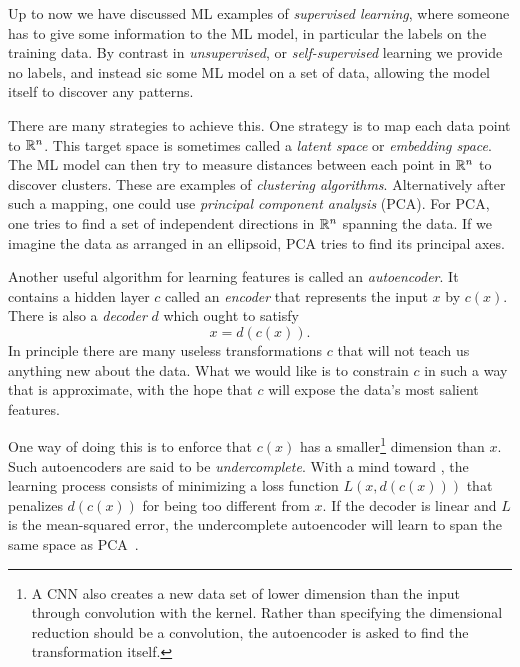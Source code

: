 Up to now we have discussed ML examples of 
{\it supervised learning},
where someone has to give some information to the ML model, in particular the
labels on the training data. By contrast in {\it unsupervised}, 
or {\it self-supervised} learning we provide no
labels, and instead sic some
ML model on a set of data, allowing the model itself to discover any patterns.

There are many strategies to achieve this. One strategy is to map each data
point to $\mathbb{R}^n$. This target space is sometimes called a 
{\it latent space}
or {\it embedding space}.
The ML model can then try to measure distances between each
point in $\mathbb{R}^n$ to discover clusters. These are examples of {\it clustering
algorithms}.
Alternatively after such a mapping, one could use 
{\it principal component analysis} (PCA).
For PCA, one tries to find a set of independent directions in $\mathbb{R}^n$ spanning
the data. If we imagine the data as arranged in an ellipsoid, PCA tries to
find its principal axes.


Another useful algorithm for learning features is called an
{\it autoencoder}. It contains a hidden layer
$c$ called an {\it encoder} that represents the input $x$
by $c(x)$. There is also a {\it decoder} $d$ which ought to satisfy
\begin{equation}\label{eq:autoencoder}
x=d(c(x)).
\end{equation}
In principle there are many useless transformations
$c$ that will not teach us anything new about the data. What we would like is to
constrain $c$ in such a way that  is approximate,
with the hope that $c$ will expose the data's most salient features.

One way of doing this is to enforce that $c(x)$ has a smaller\footnote{A CNN
also creates a new data set of lower dimension than the input through
convolution with the kernel. Rather than specifying the dimensional reduction
should be a convolution, the autoencoder is asked to find the transformation
itself.} dimension than $x$. Such autoencoders are said to be
{\it undercomplete}. With a mind toward 
, the learning process consists of minimizing
a loss function $L(x,d(c(x)))$ that penalizes $d(c(x))$ for being
too different from $x$. If the decoder is linear and $L$ is
the mean-squared error, the undercomplete autoencoder will learn to
span the same space as PCA~\cite{Goodfellow_2016}. 

